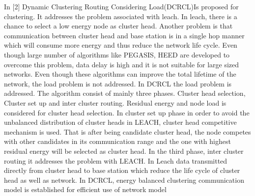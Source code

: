 \documentclass[MTech]{iitmdiss}
\begin{document}
In [2] Dynamic Clustering Routing Considering Load(DCRCL)Is proposed for clustering. It addresses the problem associated with leach. In leach, there is a chance to select a low energy node as cluster head. Another problem is that communication between cluster head and base station is in a single hop manner which will consume more energy and thus reduce the network life cycle. Even though large number of algorithms like PEGASIS, HEED are developed to overcome this problem, data delay is high and it is not suitable for large sized networks. Even though these algorithms can improve the total lifetime of the network, the load problem is not addressed.
	In DCRCL the load problem is addressed. The algorithm consist of mainly three phases. Cluster head selection, Cluster set up and inter cluster routing. Residual energy and node load is considered for cluster head selection. In cluster set up phase in order  to avoid  the unbalanced distribution of cluster heads in LEACH, cluster head competitive mechanism is used. That is after being candidate cluster head, the node competes with other candidates in its communication range and the one with highest residual energy will be selected as cluster head. In the third phase, inter cluster routing  it addresses the problem with LEACH. In Leach data transmitted directly from cluster head to base station which reduce the life cycle of cluster head as well as network. In DCRCL, energy balanced clustering communication model is established for efficient use of network model
\end{document}
